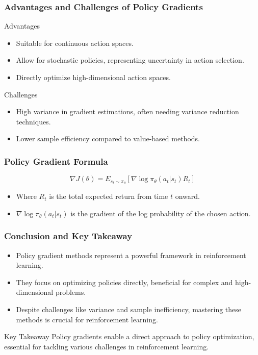 \documentclass[aspectratio=169]{beamer}
\begin{document}
\begin{frame}[fragile]
    \frametitle{Advantages and Challenges of Policy Gradients}
    \begin{block}{Advantages}
        \begin{itemize}
            \item Suitable for continuous action spaces.
            \item Allow for stochastic policies, representing uncertainty in action selection.
            \item Directly optimize high-dimensional action spaces.
        \end{itemize}
    \end{block}

    \begin{block}{Challenges}
        \begin{itemize}
            \item High variance in gradient estimations, often needing variance reduction techniques.
            \item Lower sample efficiency compared to value-based methods.
        \end{itemize}
    \end{block}
\end{frame}

\begin{frame}[fragile]
    \frametitle{Policy Gradient Formula}
    \begin{equation}
        \nabla J(\theta) = E_{s_t \sim \pi_\theta} \left[ \nabla \log \pi_\theta(a_t | s_t) R_t \right]
    \end{equation}
    \begin{itemize}
        \item Where $R_t$ is the total expected return from time $t$ onward.
        \item $\nabla \log \pi_\theta(a_t | s_t)$ is the gradient of the log probability of the chosen action.
    \end{itemize}
\end{frame}

\begin{frame}[fragile]
    \frametitle{Conclusion and Key Takeaway}
    \begin{itemize}
        \item Policy gradient methods represent a powerful framework in reinforcement learning.
        \item They focus on optimizing policies directly, beneficial for complex and high-dimensional problems.
        \item Despite challenges like variance and sample inefficiency, mastering these methods is crucial for reinforcement learning.
    \end{itemize}
    \begin{block}{Key Takeaway}
        Policy gradients enable a direct approach to policy optimization, essential for tackling various challenges in reinforcement learning.
    \end{block}
\end{frame}
\end{document}

